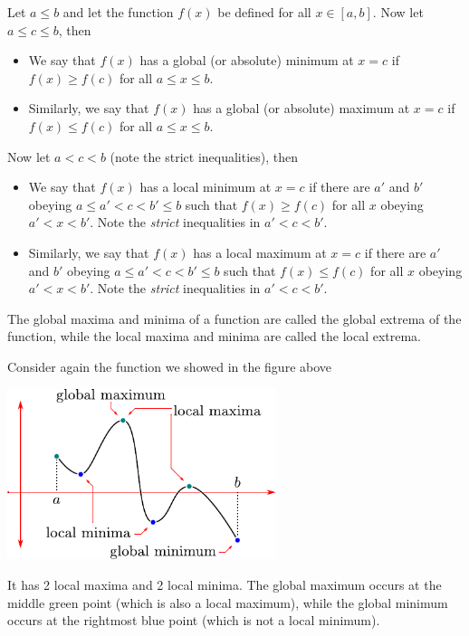 \begin{defn}\label{def:APPlocalMaxMin} %
Let $a\le b$ and let the function $f(x)$ be defined for all $x \in [a,b]$. Now
let $a \leq c \leq b$, then
\begin{itemize}
\item We say that $f(x)$ has a global (or absolute)
minimum at $x=c$ if $f(x)\ge f(c)$ for all $a\le x\le b$.

\item Similarly, we say that $f(x)$ has a global (or absolute)
maximum at $x=c$ if $f(x)\le f(c)$ for all $a\le x\le b$.

\end{itemize}
Now let $a < c <b$ (note the strict inequalities), then
\begin{itemize}
\item We say that $f(x)$ has a local minimum at $x=c$
if there are $a'$ and $b'$ obeying $a\le a'<c<b'\le b$ such that
$f(x)\ge f(c)$ for all $x$ obeying $a'<x<b'$.  Note the \emph{strict}
inequalities in $a'<c<b'$.

\item Similarly, we say that $f(x)$ has a local maximum at $x=c$
if there are $a'$ and $b'$ obeying $a\le a'<c<b'\le b$ such that
$f(x)\le f(c)$ for all $x$ obeying $a'<x<b'$.  Note the \emph{strict}
inequalities in $a'<c<b'$.
\end{itemize}
The global maxima and minima of a function are called the
global extrema of the function, while the local maxima and minima are called the local
extrema.
\end{defn}

Consider again the function we showed in the figure above
\begin{efig}
 \begin{center}
  \includegraphics[height=5cm]{extra/maxmin2}
 \end{center}
\end{efig}
It has 2 local maxima and 2 local minima. The global maximum occurs at the middle green
point (which is also a local maximum), while the global minimum occurs at the rightmost
blue point (which is not a local minimum).


